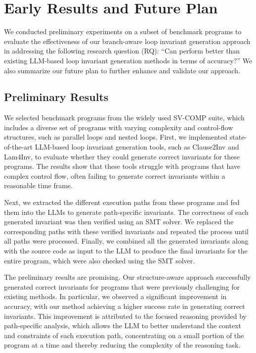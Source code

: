 \section{Early Results and Future Plan}

We conducted preliminary experiments on a subset of benchmark programs to evaluate the effectiveness of our branch-aware loop invariant generation approach in addressing the following research question (RQ): ``Can \thistool{} perform better than existing LLM-based loop invariant generation methods in terms of accuracy?'' We also summarize our future plan to further enhance and validate our approach.

\subsection{Preliminary Results}

We selected benchmark programs from the widely used SV-COMP suite, which includes a diverse set of programs with varying complexity and control-flow structures, such as parallel loops and nested loops. First, we implemented state-of-the-art LLM-based loop invariant generation tools, such as Clause2Inv and Lam4Inv, to evaluate whether they could generate correct invariants for these programs. The results show that these tools struggle with programs that have complex control flow, often failing to generate correct invariants within a reasonable time frame.

Next, we extracted the different execution paths from these programs and fed them into the LLMs to generate path-specific invariants. The correctness of each generated invariant was then verified using an SMT solver. We replaced the corresponding paths with these verified invariants and repeated the process until all paths were processed. Finally, we combined all the generated invariants along with the source code as input to the LLM to produce the final invariants for the entire program, which were also checked using the SMT solver.

The preliminary results are promising. Our structure-aware approach successfully generated correct invariants for programs that were previously challenging for existing methods. In particular, we observed a significant improvement in accuracy, with our method achieving a higher success rate in generating correct invariants. This improvement is attributed to the focused reasoning provided by path-specific analysis, which allows the LLM to better understand the context and constraints of each execution path, concentrating on a small portion of the program at a time and thereby reducing the complexity of the reasoning task.

